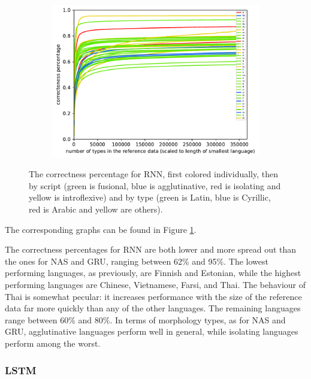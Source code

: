 \documentclass[11pt,a4paper,twoside,openright]{scrbook}
\begin{document}
\begin{figure}[h]
\begin{subfigure}[b]{0.32\textwidth}
        \includegraphics[width=\textwidth]{graphs/rnn/scripts/norm_huge_type_token_performance}
    \end{subfigure}
    \caption{The correctness percentage for RNN, first colored individually, then by script (green is fusional, blue is agglutinative, red is isolating and yellow is introflexive) and by type (green is Latin, blue is Cyrillic, red is Arabic and yellow are others).}
	\label{Figure:rnn_norm_huge_type_token_performance}
\end{figure}

The corresponding graphs can be found in Figure \ref{Figure:rnn_norm_huge_type_token_performance}.

The correctness percentages for RNN are both lower and more spread out than the ones for NAS and GRU, ranging between 62\% and 95\%. The lowest performing languages, as previously, are Finnish and Estonian, while the highest performing languages are Chinese, Vietnamese, Farsi, and Thai. The behaviour of Thai is somewhat pecular: it increases performance with the size of the reference data far more quickly than any of the other languages. The remaining languages range between 60\% and 80\%. In terms of morphology types, as for NAS and GRU, agglutinative languages perform well in general, while isolating languages perform among the worst. 

\subsubsection{LSTM}
\end{document}
